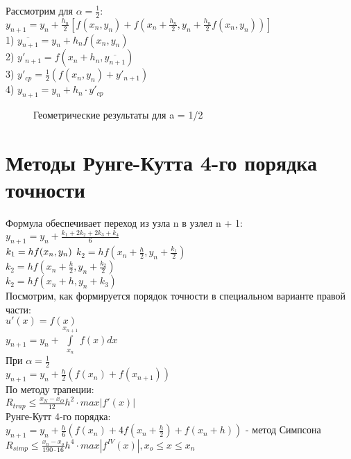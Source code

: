 Рассмотрим для $\alpha = \frac{1}{2}$:\\
$y_{n+1} =  y_{n} + \frac{h_{n}}{2}[f(x_{n}, y_{n}) + f(x_{n} + \frac{h_{n}}{2}, y_{n} + \frac{h_{n}}{2} f (x_{n}, y_{n}))]$\\
1) $\overline{y_{n+1}} = y_{n} + h_{n} f(x_{n}, y_{n})$\\
2) $y'_{n+1} = f(x_{n} + h_{n}, \overline{y_{n+1}})$\\
3) $y'_{cp} = \frac{1}{2}(f(x_{n}, y_{n}) + y'_{n+ 1})$\\
4) $y_{n+1} = y_{n} + h_{n} \cdot y'_{cp}$
\begin{figure}[H]
	\center{\texttt{[image: a\_2]}}
	\caption{Геометрические результаты для a = 1/2}
\end{figure}


\section{Методы Рунге-Кутта 4-го порядка точности}
Формула обеспечивает переход из узла n в узлел n + 1:\\
$y_{n+1} = y_{n} + \frac{k_{1} + 2k_{2} + 2k_{3} + k_{4}}{6}$\\
$k_{1} = h f(x_{n}, y_{n})\\$
$k_{2} = h f (x_{n} + \frac{h}{2}, y_{n} + \frac{k_{1}}{2})$\\
$k_{2} = h f (x_{n} + \frac{h}{2}, y_{n} + \frac{k_{2}}{2})$\\
$k_{2} = h f (x_{n} + h, y_{n} + k_{3})$\\

Посмотрим, как формируется порядок точности в специальном варианте правой части:\\
$u'(x) = f(x)$\\
$y_{n+1} = y_{n} + \int\limits^{x_{n+1}}_{x_{n}}f(x) dx$\\
При $\alpha = \frac{1}{2}$\\
$y_{n+1} = y_{n} + \frac{h}{2}(f(x_{n}) + f(x_{n+1}))$\\
По методу трапеции:\\
$R_{trap} \leqslant \frac{x_{N} - x_{O}}{12} h^{2} \cdot max|f'(x)|$\\
Рунге-Кутт 4-го порядка:\\
$y_{n+1} = y_{n} + \frac{h}{6}(f(x_{n}) + 4f(x_{n} + \frac{h}{2}) + f(x_{n} + h))$ - метод Симпсона\\
$R_{simp} \leqslant \frac{x_{n} - x_{o}}{190 \cdot 16} h^{4} \cdot max|f^{IV}(x)|, x_{o} \leqslant x \leqslant x_{n}$\\


